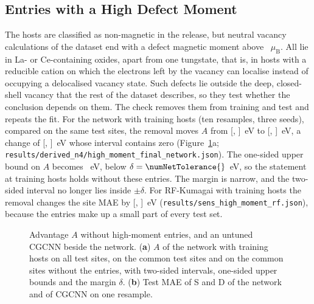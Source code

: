 \subsection{Entries with a High Defect Moment}

The hosts are classified as non-magnetic in the release, but \numSensHighMomentRfNExcludedEntries{} neutral vacancy calculations of the dataset end with a defect magnetic moment above \numSensHighMomentVOneThresholdMuB{}~$\mu_\mathrm{B}$. All lie in La- or Ce-containing oxides, apart from one tungstate, that is, in hosts with a reducible cation on which the electrons left by the vacancy can localise instead of occupying a delocalised vacancy state. Such defects lie outside the deep, closed-shell vacancy that the rest of the dataset describes, so they test whether the conclusion depends on them. The check removes them from training and test and repeats the fit. For the network with \numCfgBudgetsMax{} training hosts (ten resamples, three seeds), compared on the same test sites, the removal moves $A$ from \numNetHighMomentCommonA{} [\numNetHighMomentCommonALo{}, \numNetHighMomentCommonAHi{}]~eV to \numNetHighMomentExclA{} [\numNetHighMomentExclALo{}, \numNetHighMomentExclAHi{}]~eV, a change of \numNetHighMomentChangeA{} [\numNetHighMomentChangeALo{}, \numNetHighMomentChangeAHi{}]~eV whose interval contains zero (Figure~\ref{fig:app_sens}a; \texttt{results/derived\_n4/high\_moment\_final\_network.json}). The one-sided upper bound on $A$ becomes \numNetHighMomentExclAUpper{}~eV, below $\delta = \numNetTolerance{}$~eV, so the statement at \numCfgBudgetsMax{} training hosts holds without these entries. The margin is narrow, and the two-sided interval no longer lies inside $\pm\delta$. For RF-Kumagai with \numSensHighMomentRfPoolSize{} training hosts the removal changes the site MAE by \numSensHighMomentRfDeltaTotalExcludedMinusBaselineMaeMean{} [\numSensHighMomentRfDeltaTotalExcludedMinusBaselineMaeCiLo{}, \numSensHighMomentRfDeltaTotalExcludedMinusBaselineMaeCiHi{}]~eV (\texttt{results/sens\_high\_moment\_rf.json}), because the entries make up a small part of every test set.

\begin{figure}[H]
\centering
{}
\caption{Advantage $A$ without high-moment entries, and an untuned CGCNN beside the network. (\textbf{a}) $A$ of the network with \numCfgBudgetsMax{} training hosts on all test sites, on the common test sites and on the common sites without the entries, with two-sided intervals, one-sided upper bounds and the margin $\delta$. (\textbf{b}) Test MAE of S and D of the network and of CGCNN on one resample.\label{fig:app_sens}}
\end{figure}

